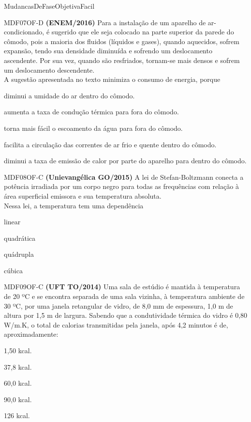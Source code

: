 \documentclass[12pt]{article}
\begin{document}
\begin{quiz}{MudancasDeFaseObjetivaFacil}
		\begin{multi}[points=1]{MDF07OF-D}
			\textbf{(ENEM/2016)} Para a instalação de um aparelho de ar-condicionado, é sugerido que ele seja colocado na parte superior da parede do cômodo, pois a maioria dos fluidos (líquidos e gases), quando aquecidos, sofrem expansão, tendo sua densidade diminuída e sofrendo um deslocamento ascendente. Por sua vez, quando são resfriados, tornam-se mais densos e sofrem um deslocamento descendente.\\			
			A sugestão apresentada no texto minimiza o consumo de energia, porque				
			\item diminui a umidade do ar dentro do cômodo.
			\item aumenta a taxa de condução térmica para fora do cômodo.
			\item torna mais fácil o escoamento da água para fora do cômodo.
			\item* facilita a circulação das correntes de ar frio e quente dentro do cômodo.
			\item diminui a taxa de emissão de calor por parte do aparelho para dentro do cômodo.
		\end{multi}
		\begin{multi}[points=1]{MDF08OF-C}
			\textbf{(Unievangélica GO/2015)} A lei de Stefan-Boltzmann conecta a potência irradiada por um corpo negro para todas as frequências com relação à área superficial emissora e sua temperatura absoluta.\\			
			Nessa lei, a temperatura tem uma dependência						
			\item linear
			\item quadrática
			\item* quádrupla
			\item cúbica
		\end{multi}
		\begin{multi}[points=1]{MDF09OF-C}
			\textbf{(UFT TO/2014)} Uma sala de estúdio é mantida à temperatura de 20 ºC e se encontra separada de uma sala vizinha, à temperatura ambiente de 30 ºC, por uma janela retangular de vidro, de 8,0 mm de espessura, 1,0 m de altura por 1,5 m de largura. Sabendo que a condutividade térmica do vidro é 0,80 W/m.K, o total de calorias transmitidas pela janela, após 4,2 minutos é de, aproximadamente:								
			\item 1,50 kcal.
			\item 37,8 kcal.
			\item 60,0 kcal.
			\item* 90,0 kcal.
			\item 126 kcal. 

\end{multi}
\end{quiz}
\end{document}
